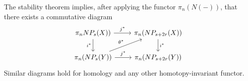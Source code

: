 The stability theorem implies, after applying the functor $\pi_n(N(-))$, that there exists a commutative diagram 
\[\begin{tikzcd}
\pi_n NP_s(X)) \arrow[r, "j^*"] \arrow[d, "i^*"']      & \pi_n (NP_{s+2r}(X)) \arrow[d, "i^*"] \\
\pi_n (NP_s(Y)) \arrow[r, "j^*"] \arrow[ru, "\theta^*"] & \pi_n (NP_{s+2r}(Y))                 
\end{tikzcd}\]
Similar diagrams hold for homology and any other homotopy-invariant functor. 